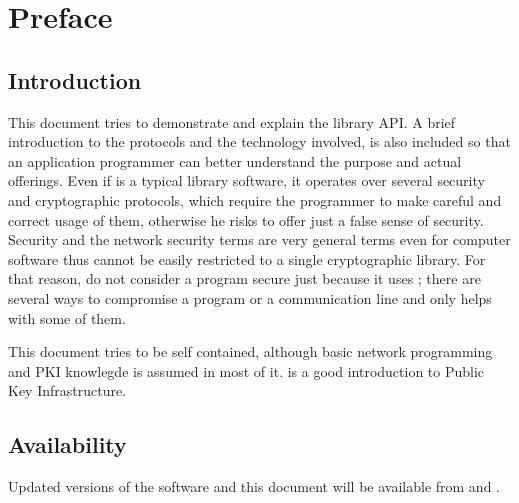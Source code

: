 \chapter*{Preface}

\section*{Introduction}
This document tries to demonstrate and explain the \gnutls{} library API.
A brief introduction to the protocols and the technology involved, is
also included so that an application programmer can better understand
the \gnutls{} purpose and actual offerings. 
Even if \gnutls{} is a typical library software, it operates over several
security and cryptographic protocols, which require the programmer
to make careful and correct usage of them, otherwise he risks to offer
just a false sense of security. Security and the network security terms
are very general terms even for computer software thus cannot be easily
restricted to a single cryptographic library.
For that reason, do not consider a program secure just because it uses \gnutls{};
there are several ways to compromise a program or a communication line
and \gnutls{} only helps with some of them. 
\par
This document tries to be self contained, although basic 
network programming and PKI knowlegde is assumed in most of it. 
\cite{GUTPKI} is a good introduction to Public Key Infrastructure.

\section*{Availability}
Updated versions of the \gnutls{} software and this document will
be available from
and .
